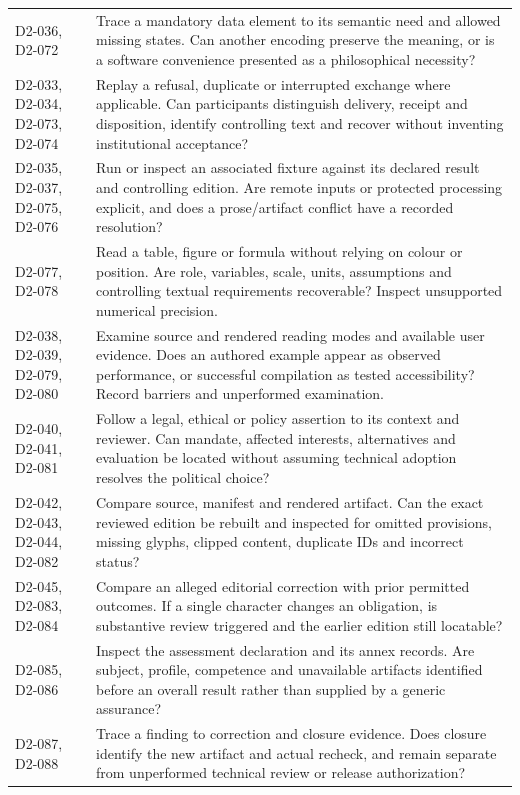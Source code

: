 \documentclass[11pt,a4paper]{article}
\begin{document}
\begin{longtable}{L{0.26\textwidth}L{0.64\textwidth}}
D2-036, D2-072 & Trace a mandatory data element to its semantic need and allowed missing states. Can another encoding preserve the meaning, or is a software convenience presented as a philosophical necessity?\\
D2-033, D2-034, D2-073, D2-074 & Replay a refusal, duplicate or interrupted exchange where applicable. Can participants distinguish delivery, receipt and disposition, identify controlling text and recover without inventing institutional acceptance?\\
D2-035, D2-037, D2-075, D2-076 & Run or inspect an associated fixture against its declared result and controlling edition. Are remote inputs or protected processing explicit, and does a prose/artifact conflict have a recorded resolution?\\
D2-077, D2-078 & Read a table, figure or formula without relying on colour or position. Are role, variables, scale, units, assumptions and controlling textual requirements recoverable? Inspect unsupported numerical precision.\\
D2-038, D2-039, D2-079, D2-080 & Examine source and rendered reading modes and available user evidence. Does an authored example appear as observed performance, or successful compilation as tested accessibility? Record barriers and unperformed examination.\\
D2-040, D2-041, D2-081 & Follow a legal, ethical or policy assertion to its context and reviewer. Can mandate, affected interests, alternatives and evaluation be located without assuming technical adoption resolves the political choice?\\
D2-042, D2-043, D2-044, D2-082 & Compare source, manifest and rendered artifact. Can the exact reviewed edition be rebuilt and inspected for omitted provisions, missing glyphs, clipped content, duplicate IDs and incorrect status?\\
D2-045, D2-083, D2-084 & Compare an alleged editorial correction with prior permitted outcomes. If a single character changes an obligation, is substantive review triggered and the earlier edition still locatable?\\
D2-085, D2-086 & Inspect the assessment declaration and its annex records. Are subject, profile, competence and unavailable artifacts identified before an overall result rather than supplied by a generic assurance?\\
D2-087, D2-088 & Trace a finding to correction and closure evidence. Does closure identify the new artifact and actual recheck, and remain separate from unperformed technical review or release authorization?\\

\end{longtable}
\end{document}
